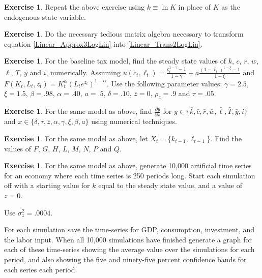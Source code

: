 \documentclass[letterpaper,12pt]{article}
\theoremstyle{definition}
\newtheorem{exercise}[theorem]{Exercise}
\begin{document}
\begin{spacing}{1.5}
	\begin{exercise} \label{Linear_HW_BM_Coeffs_Log}
		Repeat the above exercise using $k \equiv \ln K$ in place of $K$ as the endogenous state variable.
	\end{exercise}

	\begin{exercise} \label{Linear_HW_Algebra}
		Do the necessary tedious matrix algebra necessary to transform equation \eqref{Linear_Approx3LogLin} into \eqref{Linear_Trans2LogLin}.
	\end{exercise}

	\begin{exercise} \label{Linear_HW_Base_Numer_SS}
		For the baseline tax model, find the steady state values of $k$, $c$, $r$, $w$, $\ell$, $T$, $y$ and $i$, numerically.  Assuming $u(c_t,\ell_t) = \frac{c^{1-\gamma}_t -1}{1-\gamma}+ a \frac{(1-\ell_t)^{1-\xi}-1}{1-\xi}$ and $F(K_t,L_t,z_t) = K^{\alpha}_t (L_te^{z_t})^{1-\alpha} $.  Use the following parameter values: $\gamma = 2.5$, $\xi = 1.5$,  $\beta = .98$, $\alpha = .40$, $a=.5$, $\delta = .10$, $\bar z = 0$, $\rho_z=.9$ and $\tau = .05$.
	\end{exercise}

	\begin{exercise} \label{Linear_HW_Base_Numer_Deriv}
		For the same model as above, find $\frac{\partial y}{\partial x}$ for $y\in\{\bar k, \bar c, \bar r, \bar w, \bar \ell, \bar T, \bar y, \bar i\}$ and $x\in\{\delta, \tau, \bar z, \alpha, \gamma, \xi, \beta, a \}$ using numerical techniques.
	\end{exercise}

	\begin{exercise} \label{Linear_HW_Base_Coeffs}
		For the same model as above, let $X_t = \{k_{t-1}, \ell_{t-1}\}$.  Find the values of $F$, $G$, $H$, $L$, $M$, $N$, $P$ and $Q$.
	\end{exercise}

	\begin{exercise} \label{Linear_HW_Base_Sims}
		For the same model as above, generate 10,000 artificial time series for an economy where each time series is 250 periods long.  Start each simulation off with a starting value for $k$ equal to the steady state value, and a value of $z=0$.

		Use $\sigma_z^2 = .0004$.

		For each simulation save the time-series for GDP, consumption, investment, and the labor input.  When all 10,000 simulations have finished generate a graph for each of these time-series showing the average value over the simulations for each period, and also showing the five and ninety-five percent confidence bands for each series each period.
	\end{exercise}


\end{spacing}
\end{document}
